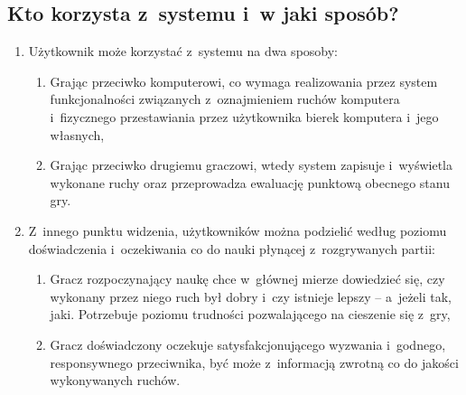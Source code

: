 \documentclass[12pt]{article}
\begin{document}
\subsection{Kto korzysta z systemu i w jaki sposób?}
\begin{enumerate}

\item Użytkownik może korzystać z systemu na dwa sposoby:
\begin{enumerate}
    \item Grając przeciwko komputerowi, co wymaga realizowania przez system funkcjonalności związanych z oznajmieniem ruchów komputera i fizycznego przestawiania przez użytkownika bierek komputera i jego własnych,
	\item Grając przeciwko drugiemu graczowi, wtedy system zapisuje i wyświetla wykonane ruchy oraz przeprowadza ewaluację punktową obecnego stanu gry.
\end{enumerate}

\item Z innego punktu widzenia, użytkowników można podzielić według poziomu doświadczenia i oczekiwania co do nauki płynącej z rozgrywanych partii:
\begin{enumerate}
\item Gracz rozpoczynający naukę chce w głównej mierze dowiedzieć się, czy wykonany przez niego ruch był dobry i czy istnieje lepszy -- a jeżeli tak, jaki. Potrzebuje poziomu trudności pozwalającego na cieszenie się z gry,
\item Gracz doświadczony oczekuje satysfakcjonującego wyzwania i godnego, responsywnego przeciwnika, być może z informacją zwrotną co do jakości wykonywanych ruchów.
\end{enumerate}

\end{enumerate}
\end{document}
